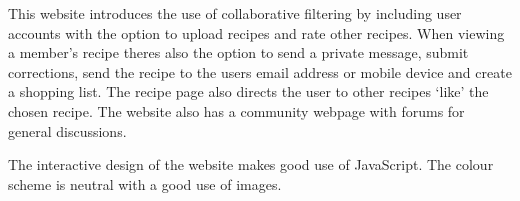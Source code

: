 This website introduces the use of collaborative filtering by including user accounts with the option to upload recipes and rate other recipes. When viewing a member’s recipe theres also the option to send a private message, submit corrections, send the recipe to the users email address or mobile device and create a shopping list. The recipe page also directs the user to other recipes ‘like’ the chosen recipe. The website also has a community webpage with forums for general discussions. 

The interactive design of the website makes good use of JavaScript. The colour scheme is neutral with a good use of images.
